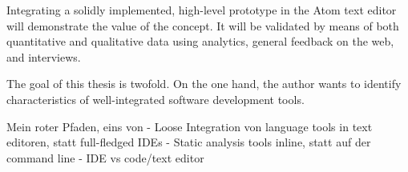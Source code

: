 Integrating a solidly implemented, high-level prototype in the Atom text
editor will demonstrate the value of the concept. It will be validated
by means of both quantitative and qualitative data using analytics,
general feedback on the web, and interviews.

The goal of this thesis is twofold. On the one hand, the author wants to
identify characteristics of well-integrated software development tools.

Mein roter Pfaden, eins von - Loose Integration von language tools in
text editoren, statt full-fledged IDEs - Static analysis tools inline,
statt auf der command line - IDE vs code/text editor

